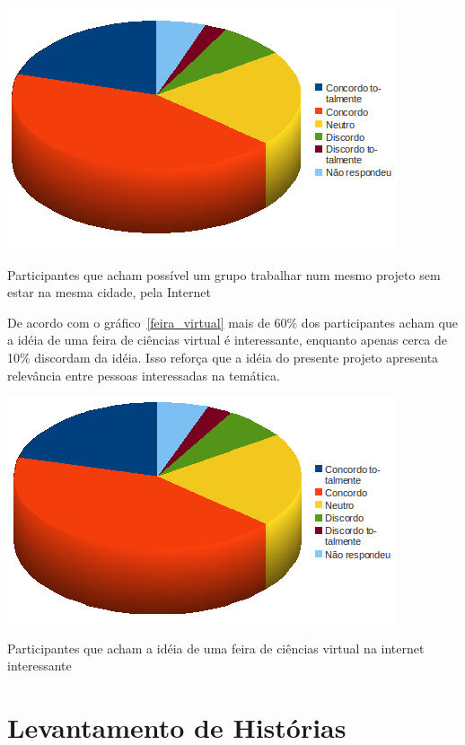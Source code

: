   \begin{grafico}
      \begin{center}
	\includegraphics[width=0.7\linewidth]{arquivos/trabalho_online.png}
      \end{center}
      \caption{Participantes que acham possível um grupo trabalhar num mesmo projeto sem estar na mesma cidade, pela Internet}
      \label{trabalho_online}
  \end{grafico}

  De acordo com o gráfico~\ref{feira_virtual} mais de 60\% dos participantes acham que a idéia de uma feira de ciências virtual é interessante, enquanto 
apenas cerca de 10\% discordam da idéia. Isso reforça que a idéia do presente projeto apresenta relevância entre pessoas interessadas na temática.

  \begin{grafico}
      \begin{center}
	\includegraphics[width=0.7\linewidth]{arquivos/feira_virtual.png}
      \end{center}
      \caption{Participantes que acham a idéia de uma feira de ciências virtual na internet interessante}
      \label{feira_virtual}
  \end{grafico}

\section{Levantamento de Histórias}

